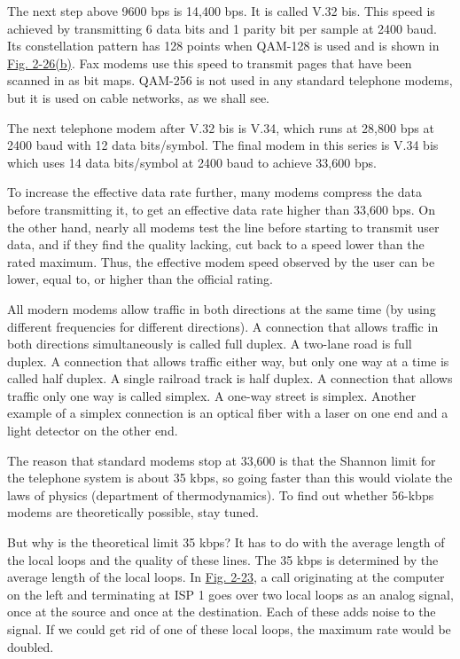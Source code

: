 \documentclass[b5paper,11pt]{memoir}
\begin{document}

The next step above 9600 bps is 14,400 bps. It is called {V.32 bis}.
This speed is achieved by transmitting 6 data bits and 1 parity bit per
sample at 2400 baud. Its constellation pattern has 128 points when
QAM-128 is used and is shown in
\protect\hyperlink{0130661023_ch02lev1sec5.htmlux5cux23ch02fig26}{Fig.
2-26(b)}. Fax modems use this speed to transmit pages that have been
scanned in as bit maps. QAM-256 is not used in any standard telephone
modems, but it is used on cable networks, as we shall see.

The next telephone modem after V.32 bis is {V.34}, which runs at 28,800
bps at 2400 baud with 12 data bits/symbol. The final modem in this
series is {V.34 bis} which uses 14 data bits/symbol at 2400 baud to
achieve 33,600 bps.

To increase the effective data rate further, many modems compress the
data before transmitting it, to get an effective data rate higher than
33,600 bps. On the other hand, nearly all modems test the line before
starting to transmit user data, and if they find the quality lacking,
cut back to a speed lower than the rated maximum. Thus, the {effective}
modem speed observed by the user can be lower, equal to, or higher than
the official rating.

All modern modems allow traffic in both directions at the same time (by
using different frequencies for different directions). A connection that
allows traffic in both directions simultaneously is called {full
duplex}. A two-lane road is full duplex. A connection that allows
traffic either way, but only one way at a time is called {half duplex}.
A single railroad track is half duplex. A connection that allows traffic
only one way is called {simplex}. A one-way street is simplex. Another
example of a simplex connection is an optical fiber with a laser on one
end and a light detector on the other end.

The reason that standard modems stop at 33,600 is that the Shannon limit
for the telephone system is about 35 kbps, so going faster than this
would violate the laws of physics (department of thermodynamics). To
find out whether 56-kbps modems are theoretically possible, stay tuned.

But why is the theoretical limit 35 kbps? It has to do with the average
length of the local loops and the quality of these lines. The 35 kbps is
determined by the average length of the local loops. In
\protect\hyperlink{0130661023_ch02lev1sec5.htmlux5cux23ch02fig23}{Fig.
2-23}, a call originating at the computer on the left and terminating at
ISP 1 goes over two local loops as an analog signal, once at the source
and once at the destination. Each of these adds noise to the signal. If
we could get rid of one of these local loops, the maximum rate would be
doubled.
\end{document}

